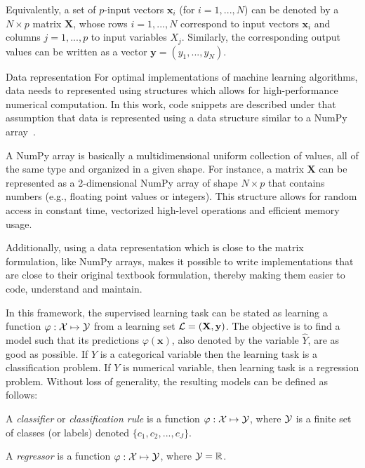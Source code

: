 Equivalently, a set of $p$-input vectors $\mathbf{x}_i$ (for $i=1, ..., N$) can
be denoted by a $N\times p$ matrix $\mathbf{X}$, whose rows $i=1, ..., N$
correspond to input vectors $\mathbf{x}_i$ and columns $j=1, ..., p$ to input
variables $X_j$. Similarly, the corresponding output values can be written as a
vector $\mathbf{y}=(y_1, ..., y_N)$.

\begin{remark}{Data representation}
For optimal implementations of machine learning algorithms, data needs to
represented using structures which allows for high-performance numerical
computation. In this work, code snippets are described under  that assumption
that data is represented using a data structure similar to a NumPy
array~\citep{vanderwalt:2011}.

A NumPy array is basically a multidimensional uniform collection of values, all
of the same type and organized in a given shape. For instance, a matrix
$\mathbf{X}$ can be represented as a 2-dimensional NumPy array of shape $N
\times p$ that contains numbers (e.g., floating point values or integers). This
structure allows for random access in constant time, vectorized high-level
operations and efficient memory usage.

Additionally, using a data representation which is close to the matrix
formulation, like NumPy arrays, makes it possible to write implementations that
are close to their original textbook formulation, thereby making them easier to code,
understand and maintain. \end{remark}

In this framework, the supervised learning task can be stated as learning a
function $\varphi: {\cal X} \mapsto {\cal Y}$ from a learning set ${\cal
L}=(\mathbf{X}, \mathbf{y})$. The objective is
to find a model such that its predictions $\varphi(\mathbf{x})$, also denoted
by the variable $\hat{Y}$, are as good as possible. If $Y$ is a categorical
variable then the learning task is a classification problem. If $Y$ is
numerical variable, then learning task is a regression problem. Without loss of
generality, the resulting models can be defined as
follows:

\begin{definition}
A \emph{classifier} or \emph{classification rule} is a function $\varphi: {\cal X}
\mapsto {\cal Y}$, where ${\cal Y}$ is a finite set of classes (or labels) denoted $\{c_1, c_2, ..., c_J\}$.
\end{definition}

\begin{definition}
A \emph{regressor} is a function $\varphi: {\cal X} \mapsto {\cal Y}$, where ${\cal Y}=\mathbb{R}$.
\end{definition}

